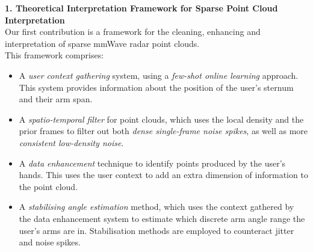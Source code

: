 \noindent \textbf{1. Theoretical Interpretation Framework for Sparse Point Cloud Interpretation}\\
Our first contribution is a framework for the cleaning, enhancing and interpretation of sparse mmWave radar point clouds.\\
This framework comprises:
\begin{itemize}
    \item
        A \textit{user context gathering} system, using a \textit{few-shot online learning} approach.
        This system provides information about the position of the user's sternum and their arm span.
    \item 
        A \textit{spatio-temporal filter} for point clouds, which uses the local density and the prior frames to filter out both \textit{dense single-frame noise spikes}, as well as more \textit{consistent low-density noise}.
    \item
        A \textit{data enhancement} technique to identify points produced by the user's hands.
        This uses the user context to add an extra dimension of information to the point cloud.
    \item 
        A \textit{stabilising angle estimation} method, which uses the context gathered by the data enhancement system to estimate which discrete arm angle range the user's arms are in.
        Stabilisation methods are employed to counteract jitter and noise spikes.
\end{itemize}


